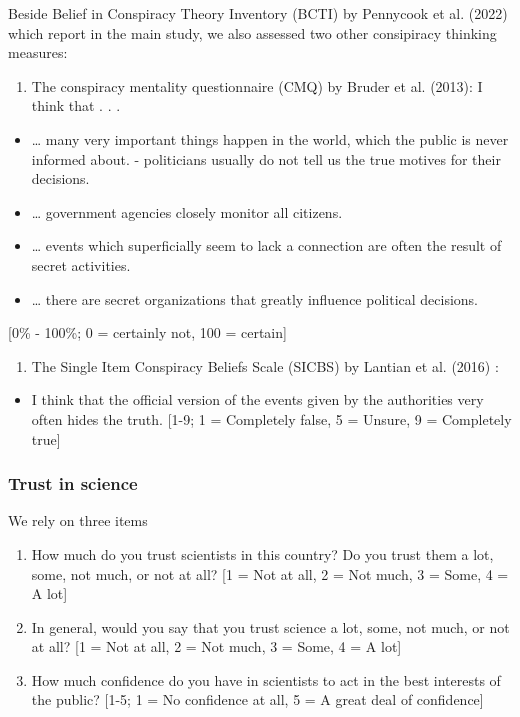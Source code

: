 \documentclass[
  doc,floatsintext]{apa6}
\providecommand{\tightlist}{%
  \setlength{\itemsep}{0pt}\setlength{\parskip}{0pt}}
\begin{document}
Beside Belief in Conspiracy Theory Inventory (BCTI) by Pennycook et al. (2022) which report in the main study, we also assessed two other consipiracy thinking measures:

\begin{enumerate}
\def\labelenumi{\arabic{enumi}.}
\tightlist
\item
  The conspiracy mentality questionnaire (CMQ) by Bruder et al. (2013):
  I think that . . .
\end{enumerate}

\begin{itemize}
\tightlist
\item
  \ldots{} many very important things happen in the world, which the public is never informed about. - politicians usually do not tell us the true motives for their decisions.
\item
  \ldots{} government agencies closely monitor all citizens.
\item
  \ldots{} events which superficially seem to lack a connection are often the result of secret activities.
\item
  \ldots{} there are secret organizations that greatly influence political decisions.
\end{itemize}

{[}0\% - 100\%; 0 = certainly not, 100 = certain{]}

\begin{enumerate}
\def\labelenumi{\arabic{enumi}.}
\setcounter{enumi}{1}
\tightlist
\item
  The Single Item Conspiracy Beliefs Scale (SICBS) by Lantian et al. (2016) :
\end{enumerate}

\begin{itemize}
\tightlist
\item
  I think that the official version of the events given by the authorities very often hides the truth. {[}1-9; 1 = Completely false, 5 = Unsure, 9 = Completely true{]}
\end{itemize}

\subsubsection{Trust in science}\label{trust-in-science-1}

We rely on three items

\begin{enumerate}
\def\labelenumi{\arabic{enumi}.}
\item
  How much do you trust scientists in this country? Do you trust them a lot, some, not much, or not at all? {[}1 = Not at all, 2 = Not much, 3 = Some, 4 = A lot{]}
\item
  In general, would you say that you trust science a lot, some, not much, or not at all? {[}1 = Not at all, 2 = Not much, 3 = Some, 4 = A lot{]}
\item
  How much confidence do you have in scientists to act in the best interests of the public? {[}1-5; 1 = No confidence at all, 5 = A great deal of confidence{]}
\end{enumerate}
\end{document}
